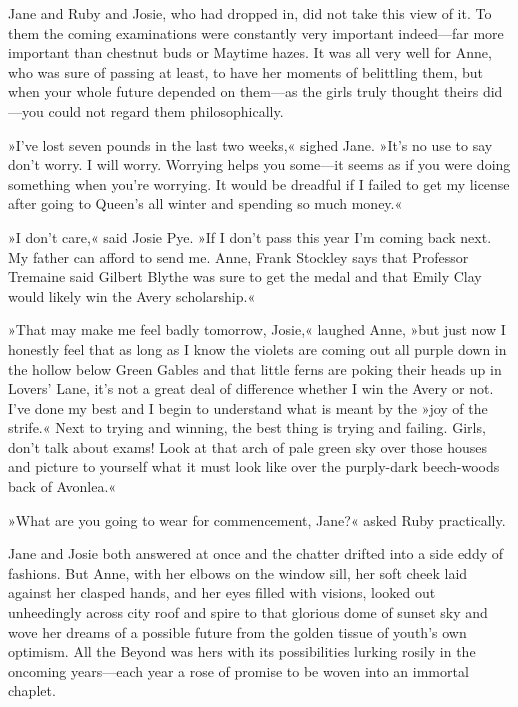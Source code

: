 Jane and Ruby and Josie, who had dropped in, did not take this view of it. To them the coming examinations were constantly very important indeed—far more important than chestnut buds or Maytime hazes. It was all very well for Anne, who was sure of passing at least, to have her moments of belittling them, but when your whole future depended on them—as the girls truly thought theirs did—you could not regard them philosophically.

»I've lost seven pounds in the last two weeks,« sighed Jane. »It's no use to say don't worry. I will worry. Worrying helps you some—it seems as if you were doing something when you're worrying. It would be dreadful if I failed to get my license after going to Queen's all winter and spending so much money.«

»I don't care,« said Josie Pye. »If I don't pass this year I'm coming back next. My father can afford to send me. Anne, Frank Stockley says that Professor Tremaine said Gilbert Blythe was sure to get the medal and that Emily Clay would likely win the Avery scholarship.«

»That may make me feel badly tomorrow, Josie,« laughed Anne, »but just now I honestly feel that as long as I know the violets are coming out all purple down in the hollow below Green Gables and that little ferns are poking their heads up in Lovers' Lane, it's not a great deal of difference whether I win the Avery or not. I've done my best and I begin to understand what is meant by the »joy of the strife.« Next to trying and winning, the best thing is trying and failing. Girls, don't talk about exams! Look at that arch of pale green sky over those houses and picture to yourself what it must look like over the purply-dark beech-woods back of Avonlea.«

»What are you going to wear for commencement, Jane?« asked Ruby practically.

Jane and Josie both answered at once and the chatter drifted into a side eddy of fashions. But Anne, with her elbows on the window sill, her soft cheek laid against her clasped hands, and her eyes filled with visions, looked out unheedingly across city roof and spire to that glorious dome of sunset sky and wove her dreams of a possible future from the golden tissue of youth's own optimism. All the Beyond was hers with its possibilities lurking rosily in the oncoming years—each year a rose of promise to be woven into an immortal chaplet.

\makeatletter
{}
{%
	\enlargethispage{\baselineskip}
}{%
}
\makeatother
